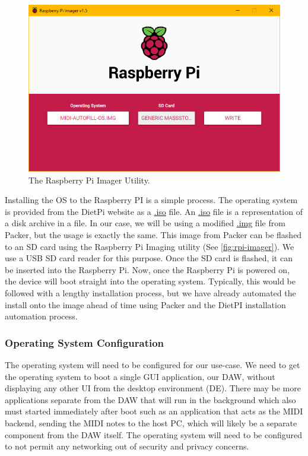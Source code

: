 \begin{figure}[h!]
  \centering
  \includegraphics[width=\linewidth]{image/rpi-imager.png}
  \caption{The Raspberry Pi Imager Utility.}
  \label{fig:rpi-imager}
\end{figure}

Installing the OS to the Raspberry PI is a simple process. The operating system is
provided from the DietPi website as a \url{.iso} file. An \url{.iso} file is a
representation of a disk archive in a file. In our case, we will be using a modified
\url{.img} file from Packer, but the usage is exactly the same. This image from Packer can
be flashed to an SD card using the Raspberry Pi Imaging utility (See
\autoref{fig:rpi-imager}). We use a USB SD card reader for this purpose. Once the SD card
is flashed, it can be inserted into the Raspberry Pi. Now, once the Raspberry Pi is
powered on, the device will boot straight into the operating system. Typically, this would
be followed with a lengthy installation process, but we have already automated the install
onto the image ahead of time using Packer and the DietPI installation automation process.

\subsubsection{Operating System Configuration}
\label{sec:research:subsec:os_config}

The operating system will need to be configured for our use-case. We need to get the
operating system to boot a single GUI application, our DAW, without displaying any other
UI from the desktop environment (DE). There may be more applications separate from the DAW
that will run in the background which also must started immediately after boot such as an
application that acts as the MIDI backend, sending the MIDI notes to the host PC, which
will likely be a separate component from the DAW itself. The operating system will need to
be configured to not permit any networking out of security and privacy concerns.


